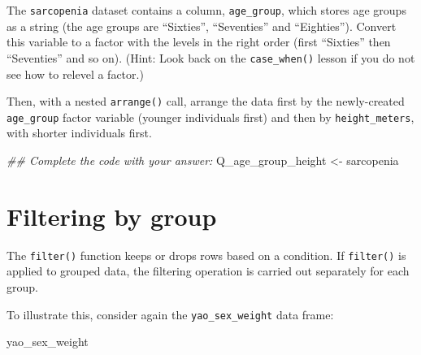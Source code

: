 \documentclass[
  letterpaper,
  DIV=11,
  numbers=noendperiod]{scrreprt}
\newenvironment{Shaded}{\begin{snugshade}}{\end{snugshade}}
\newcommand{\DocumentationTok}[1]{\textcolor[rgb]{0.37,0.37,0.37}{\textit{#1}}}
\newcommand{\NormalTok}[1]{\textcolor[rgb]{0.00,0.23,0.31}{#1}}
\newcommand{\OtherTok}[1]{\textcolor[rgb]{0.00,0.23,0.31}{#1}}
\begin{document}
\begin{tcolorbox}[enhanced jigsaw, colframe=quarto-callout-tip-color-frame, rightrule=.15mm, opacityback=0, breakable, coltitle=black, colbacktitle=quarto-callout-tip-color!10!white, bottomrule=.15mm, leftrule=.75mm, toprule=.15mm, arc=.35mm, bottomtitle=1mm, colback=white, left=2mm, opacitybacktitle=0.6, titlerule=0mm, title=\textcolor{quarto-callout-tip-color}{\faLightbulb}\hspace{0.5em}{Practice}, toptitle=1mm]

The \texttt{sarcopenia} dataset contains a column, \texttt{age\_group},
which stores age groups as a string (the age groups are ``Sixties'',
``Seventies'' and ``Eighties''). Convert this variable to a factor with
the levels in the right order (first ``Sixties'' then ``Seventies'' and
so on). (Hint: Look back on the \texttt{case\_when()} lesson if you do
not see how to relevel a factor.)

Then, with a nested \texttt{arrange()} call, arrange the data first by
the newly-created \texttt{age\_group} factor variable (younger
individuals first) and then by \texttt{height\_meters}, with shorter
individuals first.

\begin{Shaded}
\begin{Highlighting}[]
\DocumentationTok{\#\# Complete the code with your answer:}
\NormalTok{Q\_age\_group\_height }\OtherTok{\textless{}{-}} 
\NormalTok{  sarcopenia }
\end{Highlighting}
\end{Shaded}

\end{tcolorbox}

\hypertarget{filtering-by-group}{%
\section{Filtering by group}\label{filtering-by-group}}

The \texttt{filter()} function keeps or drops rows based on a condition.
If \texttt{filter()} is applied to grouped data, the filtering operation
is carried out separately for each group.

To illustrate this, consider again the \texttt{yao\_sex\_weight} data
frame:

\begin{Shaded}
\begin{Highlighting}[]
\NormalTok{yao\_sex\_weight}
\end{Highlighting}
\end{Shaded}
\end{document}
